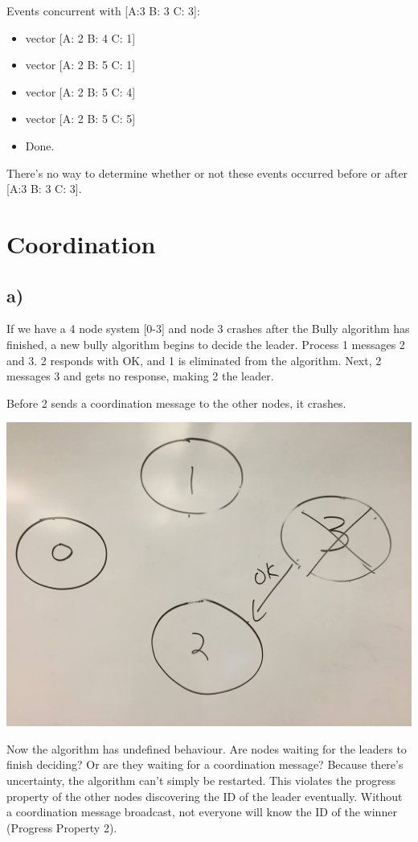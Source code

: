 \documentclass[12pt]{article}
\begin{document}
Events concurrent with [A:3 B: 3 C: 3]:

\begin{itemize}
\item vector [A: 2 B: 4 C: 1]
\item vector [A: 2 B: 5 C: 1]
\item vector [A: 2 B: 5 C: 4]
\item vector [A: 2 B: 5 C: 5]
\item Done.
\end{itemize}
There's no way to determine whether or not these events occurred before or after [A:3 B: 3 C: 3].
\section{Coordination}
\subsection*{a)}
If we have a 4 node system [0-3] and node 3 crashes after the Bully algorithm has finished, a new bully algorithm begins to decide the leader. Process 1 messages 2 and 3. 2 responds with OK, and 1 is eliminated from the algorithm. Next, 2 messages 3 and gets no response, making 2 the leader.

Before 2 sends a coordination message to the other nodes, it crashes.

\begin{center}
\includegraphics[scale=0.1]{nodes0}
\end{center}

Now the algorithm has undefined behaviour. Are nodes waiting for the leaders to finish deciding? Or are they waiting for a coordination message? Because there's uncertainty, the algorithm can't simply be restarted. This violates the progress property of the other nodes discovering the ID of the leader eventually. Without a coordination message broadcast, not everyone will know the ID of the winner (Progress Property 2).
\end{document}
